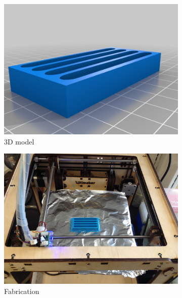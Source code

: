 \documentclass[fleqn,10pt]{wlpeerj}
\begin{document}
\begin{figure}
    \centering
        \begin{subfigure}[b]{0.24\textwidth}
        \centering
        \includegraphics[width=\textwidth]{swim_plate_0}
        \caption{3D model}
        \label{fig:swim_plate_0}
    \end{subfigure}
    \hfill
    \begin{subfigure}[b]{0.24\textwidth}
        \centering
        \includegraphics[width=\textwidth]{swim_plate_1}
        \caption{Fabrication}
        \label{fig:swim_plate_1}
    \end{subfigure}
    \hfill
    \begin{subfigure}[b]{0.24\textwidth}
        \centering

\end{subfigure}
\end{figure}
\end{document}
